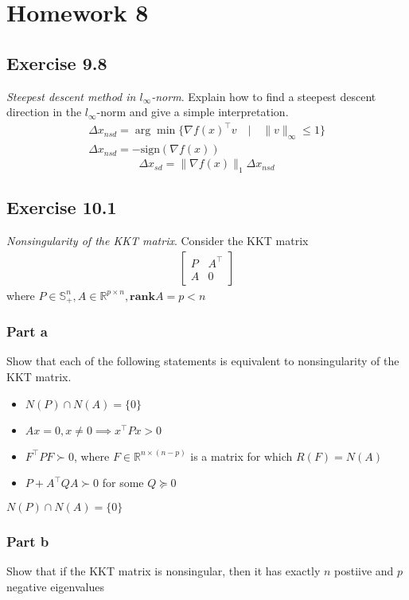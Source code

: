 \section{Homework 8}
\subsection{Exercise 9.8}
\textit{Steepest descent method in $l_\infty$-norm}. Explain how to find a steepest descent direction in the $l_\infty$-norm and give a simple interpretation.
\begin{gather}
    \Delta x_{nsd} = \arg \min \{ \nabla f(x)^\top v \quad | \quad  \| v \|_\infty \leq 1 \} \\
    \Delta x_{nsd} = - \text{sign}(\nabla f(x))
\end{gather}
\begin{equation}
    \Delta x_{sd} = \| \nabla f(x) \|_1  \Delta x_{nsd}
\end{equation}

\subsection{Exercise 10.1}
\textit{Nonsingularity of the KKT matrix}. Consider the KKT matrix
\begin{align}
  \begin{bmatrix}
     P & A^\top \\
     A & 0
  \end{bmatrix}
\end{align}
where $P \in \mathbb{S}_+^n, A \in \mathbb{R}^{p \times n}, \textbf{rank} A = p < n$
\subsubsection{Part a}
Show that each of the following statements is equivalent to nonsingularity of the KKT matrix.
\begin{itemize}
    \item $N(P) \cap N(A) = \{ 0 \}$
    \item $Ax = 0, x \neq 0 \implies x^\top P x > 0$
    \item $F^\top P F \succ 0$, where $F \in \mathbb{R} ^{n \times (n-p)}$ is a matrix for which $R(F) = N(A)$
    \item $P + A^\top Q A \succ 0$ for some $Q \succeq 0$
\end{itemize}
$N(P) \cap N(A) = \{ 0 \}$

\subsubsection{Part b}
Show that if the KKT matrix is nonsingular, then it has exactly $n$ postiive and $p$ negative eigenvalues

